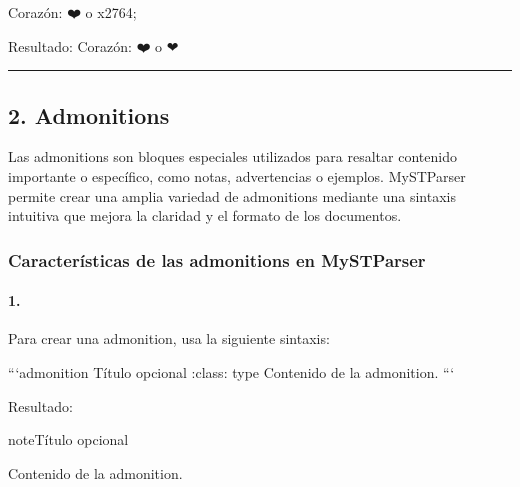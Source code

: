 \documentclass[a4paper,10pt,spanish]{sphinxmanual}
\begin{document}
\begin{sphinxVerbatim}[commandchars=\\\{\}]
Corazón: ❤️ o \PYGZam{}\PYGZsh{}x2764;
\end{sphinxVerbatim}

\sphinxAtStartPar
Resultado: Corazón: ❤️ o ❤


\bigskip\hrule\bigskip



\subsection{2. Admonitions}
\label{\detokenize{configuracion_inicial/013.guia_de_myst_parser:admonitions}}
\sphinxAtStartPar
Las admonitions son bloques especiales utilizados para resaltar contenido importante o específico, como notas, advertencias o ejemplos. MyST\sphinxhyphen{}Parser permite crear una amplia variedad de admonitions mediante una sintaxis intuitiva que mejora la claridad y el formato de los documentos.


\subsubsection{Características de las admonitions en MyST\sphinxhyphen{}Parser}
\label{\detokenize{configuracion_inicial/013.guia_de_myst_parser:caracteristicas-de-las-admonitions-en-myst-parser}}

\paragraph{1. }
\label{\detokenize{configuracion_inicial/013.guia_de_myst_parser:sintaxis-basica}}
\sphinxAtStartPar
Para crear una admonition, usa la siguiente sintaxis:

\begin{sphinxVerbatim}[commandchars=\\\{\}]
    ```\PYGZob{}admonition\PYGZcb{} Título opcional :class: type Contenido de la admonition. ```
\end{sphinxVerbatim}

\sphinxAtStartPar
Resultado:

\begin{sphinxadmonition}{note}{Título opcional}

\sphinxAtStartPar
Contenido de la admonition.
\end{sphinxadmonition}
\end{document}
